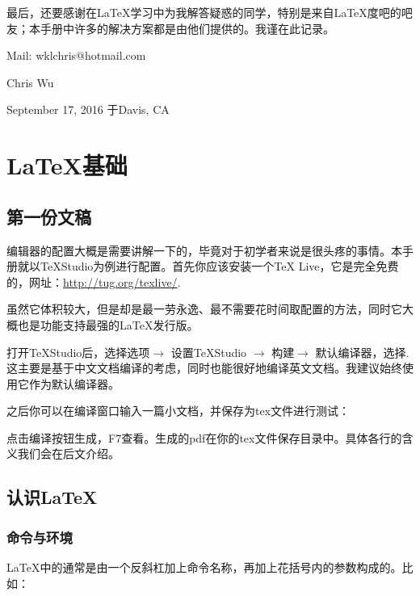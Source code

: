 最后，还要感谢在\LaTeX 学习中为我解答疑惑的同学，特别是来自\LaTeX 度吧的吧友；本手册中许多的解决方案都是由他们提供的。我谨在此记录。

\vfill

\begin{flushright}
Mail: wklchris@hotmail.com\dpar

Chris Wu

September 17, 2016 于Davis, CA
\end{flushright}



\chapter{\LaTeX{}基础}
\section{第一份文稿}

编辑器的配置大概是需要讲解一下的，毕竟对于初学者来说是很头疼的事情。本手册就以\TeX Studio为例进行配置。首先你应该安装一个\TeX{} Live，它是完全免费的，网址：\url{http://tug.org/texlive/}.

虽然它体积较大，但是却是最一劳永逸、最不需要花时间取配置的方法，同时它大概也是功能支持最强的\LaTeX 发行版。

打开\TeX Studio后，选择选项$\rightarrow$ 设置\TeX Studio $\rightarrow$ 构建$\rightarrow$ 默认编译器，选择\xelatex{}. 这主要是基于中文文档编译的考虑，同时\xelatex 也能很好地编译英文文档。我建议始终使用它作为默认编译器。\dpar

之后你可以在编译窗口输入一篇小文档，并保存为tex文件进行测试：

点击编译按钮生成，F7查看。生成的pdf在你的tex文件保存目录中。具体各行的含义我们会在后文介绍。

\section{认识\LaTeX}
\subsection{命令与环境}
\LaTeX 中的通常是由一个反斜杠加上命令名称，再加上花括号内的参数构成的。比如：

